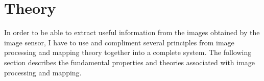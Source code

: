 \section{Theory}
In order to be able to extract useful information from the images obtained by the image sensor, I have to use and compliment several principles from image processing and mapping theory together into a complete system. 
The following section describes the fundamental properties and theories associated with image processing and mapping.


\newpage


